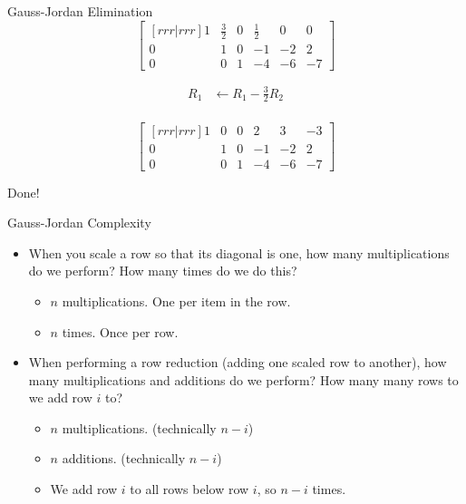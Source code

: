 \documentclass[serif,xcolor=pdftex,dvipsnames,table,hyperref={bookmarks=false,breaklinks}]{beamer}
\begin{document}
\begin{frame}[t]{Gauss-Jordan Elimination}
	$$\begin{bmatrix}[rrr|rrr]
    	1 & \frac{3}{2} & 0 & \frac{1}{2} & 0 & 0\\
		0 & 1 & 0 & -1 & -2 & 2\\
		0 & 0 & 1 & -4 & -6 & -7
	\end{bmatrix}$$
	
	\pause
	\begin{align*}
		R_1 &\leftarrow R_1 - \frac{3}{2}R_2\\
	\end{align*}
	
	\pause
	$$\begin{bmatrix}[rrr|rrr]
    	1 & 0 & 0 & 2 & 3 & -3\\
		0 & 1 & 0 & -1 & -2 & 2\\
		0 & 0 & 1 & -4 & -6 & -7
	\end{bmatrix}$$
	
	\pause
	\centering
	\Huge{Done!}
	
\end{frame}

\begin{frame}[t]{Gauss-Jordan Complexity}
	\pause
	\begin{itemize}[<+->]
		\item When you scale a row so that its diagonal is one, how many multiplications do we perform? How many times do we do this?
		\begin{itemize}[<+->]
			\item $n$ multiplications. One per item in the row.
			\item $n$ times. Once per row.
		\end{itemize}
		\item When performing a row reduction (adding one scaled row to another), how many multiplications and additions do we perform? How many many rows to we add row $i$ to?
		\begin{itemize}
			\item $n$ multiplications. (technically $n-i$)
			\item $n$ additions. (technically $n-i$)
			\item We add row $i$ to all rows below row $i$, so $n-i$ times.
		\end{itemize}
	\end{itemize}
\end{frame}
\end{document}
